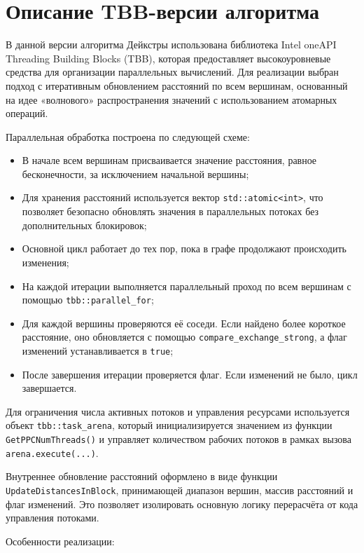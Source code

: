 \documentclass[12pt,a4paper]{extarticle}
\begin{document}
\section{Описание TBB-версии алгоритма}

В данной версии алгоритма Дейкстры использована библиотека Intel oneAPI Threading Building Blocks
(TBB), которая предоставляет высокоуровневые средства для организации параллельных вычислений.
Для реализации выбран подход с итеративным обновлением расстояний по всем вершинам, основанный
на идее «волнового» распространения значений с использованием атомарных операций.

Параллельная обработка построена по следующей схеме:

\begin{itemize}
    \item В начале всем вершинам присваивается значение расстояния, равное бесконечности,
    за исключением начальной вершины;
    \item Для хранения расстояний используется вектор \texttt{std::atomic<int>}, что позволяет
    безопасно обновлять значения в параллельных потоках без дополнительных блокировок;
    \item Основной цикл работает до тех пор, пока в графе продолжают происходить изменения;
    \item На каждой итерации выполняется параллельный проход по всем вершинам с помощью
    \texttt{tbb::parallel\_for};
    \item Для каждой вершины проверяются её соседи. Если найдено более короткое расстояние,
    оно обновляется с помощью \texttt{compare\_exchange\_strong}, а флаг изменений устанавливается в \texttt{true};
    \item После завершения итерации проверяется флаг. Если изменений не было, цикл завершается.
\end{itemize}

Для ограничения числа активных потоков и управления ресурсами используется объект
\texttt{tbb::task\_arena}, который инициализируется значением из функции
\texttt{GetPPCNumThreads()} и управляет количеством рабочих потоков в рамках вызова
\texttt{arena.execute(...)}.

Внутреннее обновление расстояний оформлено в виде функции
\texttt{UpdateDistancesInBlock}, принимающей диапазон вершин, массив расстояний и флаг
изменений. Это позволяет изолировать основную логику перерасчёта от кода управления потоками.

Особенности реализации:
\end{document}
